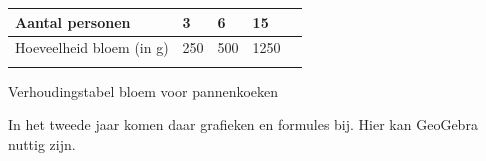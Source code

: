 \begin{multicols}{2}
\begin{tabel}
		\begin{tabular}{m{4cm} C{.6cm} C{.8cm} C{1cm} C{1.1cm}}  %
			\hlinethick  %
			
			Aantal personen  & 3 & 6 & 15 \\
			
			\hline
			Hoeveelheid bloem (in g)
			\quad & 250 & 500 & 1250  \\
			
			\hlinethick
		\end{tabular}
		\caption{Verhoudingstabel bloem voor pannenkoeken}\label{tab:vbmulticol}
	\end{tabel}


In het tweede jaar komen daar grafieken en formules bij. Hier kan GeoGebra nuttig zijn.

\end{multicols}

